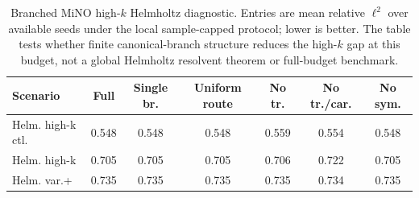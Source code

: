 \begin{table}[t]
\centering
\caption{Branched MiNO high-$k$ Helmholtz diagnostic. Entries are mean relative $\ell^2$ over available seeds under the local sample-capped protocol; lower is better. The table tests whether finite canonical-branch structure reduces the high-$k$ gap at this budget, not a global Helmholtz resolvent theorem or full-budget benchmark.}
\label{tab:helmholtz-branched-highk}
\scriptsize
\begin{tabular}{lcccccc}
\toprule
Scenario & Full & Single br. & Uniform route & No tr. & No tr./car. & No sym. \\
\midrule
Helm. high-k ctl. & 0.548 & 0.548 & 0.548 & 0.559 & 0.554 & 0.548 \\
Helm. high-k & 0.705 & 0.705 & 0.705 & 0.706 & 0.722 & 0.705 \\
Helm. var.+ & 0.735 & 0.735 & 0.735 & 0.735 & 0.734 & 0.735 \\
\bottomrule
\end{tabular}
\end{table}
